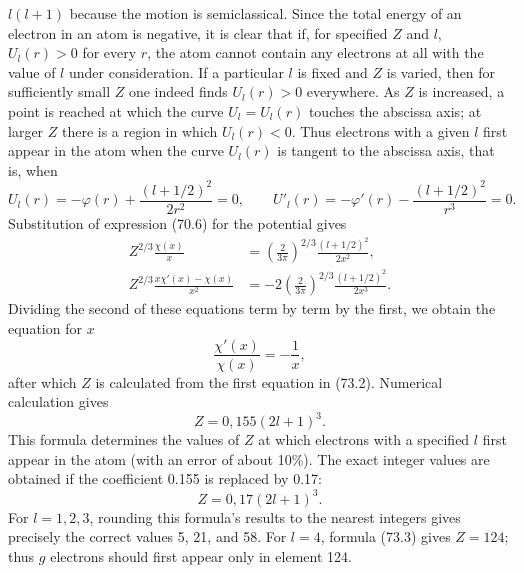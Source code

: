 $l(l+1)$ because the motion is semiclassical. Since the total energy of an electron in an atom is negative, it is clear that if, for specified $Z$ and $l$, $U_l(r)>0$ for every $r$, the atom cannot contain any electrons at all with the value of $l$ under consideration. If a particular $l$ is fixed and $Z$ is varied, then for sufficiently small $Z$ one indeed finds $U_l(r)>0$ everywhere. As $Z$ is increased, a point is reached at which the curve $U_l=U_l(r)$ touches the abscissa axis; at larger $Z$ there is a region in which $U_l(r)<0$. Thus electrons with a given $l$ first appear in the atom when the curve $U_l(r)$ is tangent to the abscissa axis, that is, when
\[
 U_l(r)=-\varphi(r)+\frac{(l+1/2)^2}{2r^2}=0,
 \qquad U'_l(r)=-\varphi'(r)-\frac{(l+1/2)^2}{r^3}=0.
\]
Substitution of expression (70.6) for the potential gives
\begin{equation}
\begin{split}
 Z^{2/3}\frac{\chi(x)}x&=\left(\frac2{3\pi}\right)^{2/3}\frac{(l+1/2)^2}{2x^2},\\
 Z^{2/3}\frac{x\chi'(x)-\chi(x)}{x^2}&=-2\left(\frac2{3\pi}\right)^{2/3}\frac{(l+1/2)^2}{2x^3}.
\end{split}
\tag{73.2}
\end{equation}
Dividing the second of these equations term by term by the first, we obtain the equation for $x$
\[
 \frac{\chi'(x)}{\chi(x)}=-\frac1x,
\]
after which $Z$ is calculated from the first equation in (73.2). Numerical calculation gives
\[
 Z=0{,}155(2l+1)^3.
\]
This formula determines the values of $Z$ at which electrons with a specified $l$ first appear in the atom (with an error of about 10\%). The exact integer values are obtained if the coefficient 0.155 is replaced by 0.17:
\begin{equation}
 Z=0{,}17(2l+1)^3.
 \tag{73.3}
\end{equation}
For $l=1,2,3$, rounding this formula's results to the nearest integers gives precisely the correct values 5, 21, and 58. For $l=4$, formula (73.3) gives $Z=124$; thus $g$ electrons should first appear only in element 124.
